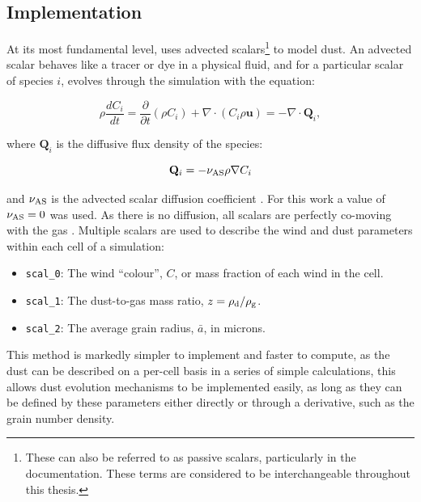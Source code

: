 \subsection{Implementation}

At its most fundamental level, \bidmas{} uses advected scalars\footnote{These can also be referred to as passive scalars, particularly in the \athena{} documentation. These terms are considered to be interchangeable throughout this thesis.} to model dust.
An advected scalar behaves like a tracer or dye in a physical fluid, and for a particular scalar of species $i$, evolves through the simulation with the equation:

\begin{equation}
  \label{eq:advection}
  \rho \frac{dC_i}{dt} = \frac{\partial}{\partial t} \left( \rho C_i \right) + \nabla \cdot \left( C_i \rho \mathbf{u} \right) = -\nabla \cdot \mathbf{Q}_i ,  
\end{equation}

\noindent
where $\mathbf{Q}_i$ is the diffusive flux density of the species:

\begin{equation}
  \mathbf{Q}_i = - \nu_\text{AS} \rho \nabla C_i
\end{equation}

\noindent
and $\nu_\text{AS}$ is the advected scalar diffusion coefficient \parencite{stoneAthenaAdaptiveMesh2020}.
For this work a value of $\nu_\text{AS} = 0$ was used.
As there is no diffusion, all scalars are perfectly co-moving with the gas \parencite[Ch.~10]{toro_riemann_2013}.
Multiple scalars are used to describe the wind and dust parameters within each cell of a simulation:

\begin{itemize}
  \item \texttt{scal\_0}: The wind ``colour'', $C$, or mass fraction of each wind in the cell. 
  \item \texttt{scal\_1}: The dust-to-gas mass ratio, $z = \rho_\text{d}/\rho_\text{g}$.
  \item \texttt{scal\_2}: The average grain radius, $\bar{a}$, in microns.
\end{itemize}

\noindent
This method is markedly simpler to implement and faster to compute, as the dust can be described on a per-cell basis in a series of simple calculations, this allows dust evolution mechanisms to be implemented easily, as long as they can be defined by these parameters either directly or through a derivative, such as the grain number density.

